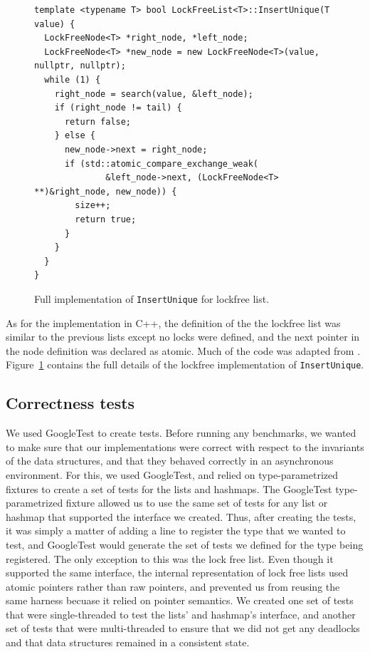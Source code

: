 \documentclass[11pt]{article}
\begin{document}
\begin{figure}
\begin{center}
\begin{lstlisting}
template <typename T> bool LockFreeList<T>::InsertUnique(T value) {
  LockFreeNode<T> *right_node, *left_node;
  LockFreeNode<T> *new_node = new LockFreeNode<T>(value, nullptr, nullptr);
  while (1) {
    right_node = search(value, &left_node);
    if (right_node != tail) {
      return false;
    } else {
      new_node->next = right_node;
      if (std::atomic_compare_exchange_weak(
              &left_node->next, (LockFreeNode<T> **)&right_node, new_node)) {
        size++;
        return true;
      }
    }
  }
}
\end{lstlisting}
\caption{Full implementation of {\tt InsertUnique} for lockfree list.}
\label{fig:lockfreeIUnique}
\end{center}
\end{figure}

As for the implementation in C++, the definition of the the lockfree list was
similar to the previous  lists except no locks were defined, and the next
pointer in the node definition was  declared as atomic. Much of the code was
adapted from \cite{Harris}. Figure~\ref{fig:lockfreeIUnique}  contains the full
details of the lockfree implementation of {\tt InsertUnique}.


\subsection{Correctness tests}
We used GoogleTest to create tests. Before running any benchmarks, we wanted to
make sure that our implementations were correct with respect to the invariants
of the data structures, and that they behaved correctly in an asynchronous
environment. For this, we used GoogleTest, and relied on type-parametrized
fixtures to create a set of tests for the lists and hashmaps. The GoogleTest
type-parametrized fixture allowed us to use the same set of tests for any list
or hashmap that supported the interface we created. Thus, after creating the
tests, it was simply a matter of adding a line to register the type that we
wanted to test, and GoogleTest would generate the set of tests we defined for
the type being registered. The only exception to this was the lock free list.
Even though it supported the same interface, the internal representation of lock
free lists used atomic pointers rather than raw pointers, and prevented us from
reusing the same harness becuase it relied on pointer semantics. We created
one set of tests that were single-threaded to test the lists' and hashmap's
interface, and another set of tests that were multi-threaded to ensure that we
did not get any deadlocks and that data structures remained in a consistent
state.
\end{document}
